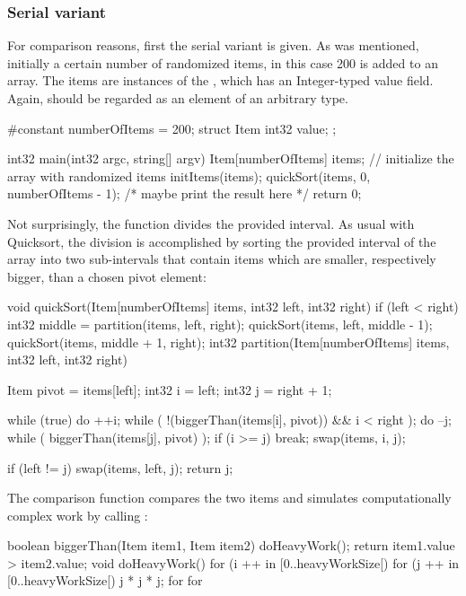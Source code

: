 \subsubsection{Serial variant}
For comparison reasons, first the serial variant is given. As was mentioned, initially a certain number of randomized items, in this case 200 is added to an array. The items are instances of the , which has an Integer-typed value field. Again,  should be regarded as an element of an arbitrary type.
\begin{ccode}
#constant numberOfItems = 200;
struct Item { int32 value; }; 
 
int32 main(int32 argc, string[] argv) { 
  Item[numberOfItems] items; 
  // initialize the array with randomized items
  initItems(items); 
  quickSort(items, 0, numberOfItems - 1); 
  /* maybe print the result here */
  return 0; 
}
\end{ccode}
Not surprisingly, the  function divides the provided interval. As usual with Quicksort, the division is accomplished by sorting the provided interval of the array into two sub-intervals that contain items which are smaller, respectively bigger, than a chosen pivot element:
\begin{ccode}
void quickSort(Item[numberOfItems] items, int32 left, int32 right) { 
  if (left < right) { 
    int32 middle = partition(items, left, right); 
    quickSort(items, left, middle - 1); 
    quickSort(items, middle + 1, right); 
  }
}
int32 partition(Item[numberOfItems] items, int32 left, int32 right) { 
  Item pivot = items[left]; 
  int32 i = left; 
  int32 j = right + 1; 
   
  while (true) { 
    do { ++i; } while ( !(biggerThan(items[i], pivot)) && i < right ); 
    do { --j; } while ( biggerThan(items[j], pivot) ); 
    if (i >= j) { break; }
    swap(items, i, j); 
  }
   
  if (left != j) { swap(items, left, j); }
  return j; 
}
\end{ccode}
The comparison function  compares the two items and simulates computationally complex work by calling :
\begin{ccode}
boolean biggerThan(Item item1, Item item2) { 
  doHeavyWork(); 
  return item1.value > item2.value; 
}
void doHeavyWork() { 
  for (i ++ in [0..heavyWorkSize[) { 
    for (j ++ in [0..heavyWorkSize[) { 
      j * j * j; 
    } for 
  } for 
}
\end{ccode}


